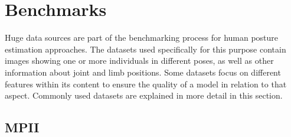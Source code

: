 \section{Benchmarks}
Huge data sources are part of the benchmarking process for human posture estimation approaches. The datasets used specifically for this purpose contain images showing one or more individuals in different poses, as well as other information about joint and limb positions. Some datasets focus on different features within its content to ensure the quality of a model in relation to that aspect. Commonly used datasets are explained in more detail in this section.

\subsection{MPII}
\cite{mpii}